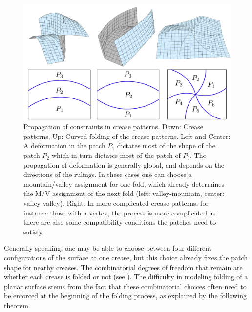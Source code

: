 \begin{figure} [t]
	\centering
	\includegraphics[width=\linewidth]{figures/multiple_crease_patterns}
	\caption{Propagation of constraints in crease patterns. Down: Crease patterns. Up: Curved folding of the crease patterns. Left and Center: A deformation in the patch $P_1$ dictates most of the shape of the patch $P_2$ which in turn dictates most of the patch of $P_3$. The propagation of deformation is generally global, and depends on the directions of the rulings. In these cases one can choose a mountain/valley assignment for one fold, which already determines the M/V assignment of the next fold (left: valley-mountain, center: valley-valley). Right: In more complicated crease patterns, for instance those with a vertex, the process is more complicated as there are also some compatibility conditions the patches need to satisfy. }
	\label{fig:multiple_crease_patterns}
\end{figure}

Generally speaking, one may be able to choose between four different configurations of the surface at one crease, but this choice already fixes the patch shape for nearby creases. The combinatorial degrees of freedom that remain are whether each crease is folded or not (see ). The difficulty in modeling folding of a planar surface stems from the fact that these combinatorial choices often need to be enforced at the beginning of the folding process, as explained by the following theorem.%

